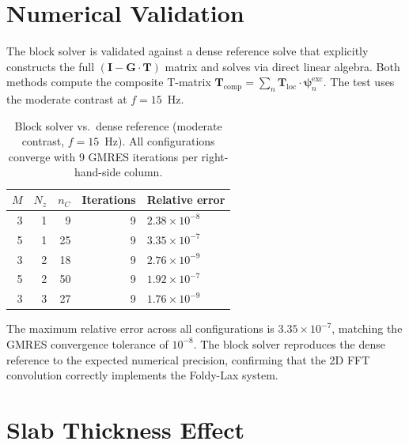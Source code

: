 \documentclass[11pt,a4paper]{article}
\theoremstyle{plain}
\theoremstyle{remark}
\begin{document}
\section{Numerical Validation}\label{sec:validation}

The block solver is validated against a dense reference solve that
explicitly constructs the full $(\mathbf{I} - \mathbf{G}\cdot
\mathbf{T})$ matrix and solves via direct linear algebra.  Both methods
compute the composite T-matrix $\mathbf{T}_{\mathrm{comp}} = \sum_n
\mathbf{T}_{\mathrm{loc}} \cdot \bm{\psi}_n^{\mathrm{exc}}$.  The test
uses the moderate contrast at $f = 15$~Hz.

\begin{table}[ht]
\centering
\renewcommand{\arraystretch}{1.2}
\caption{Block solver vs.\ dense reference (moderate contrast,
$f = 15$~Hz).  All configurations converge with 9 GMRES iterations
per right-hand-side column.}
\label{tab:validation}
\begin{tabular}{rrrrl}
  \toprule
  $M$ & $N_z$ & $n_C$ & Iterations & Relative error \\
  \midrule
  3 & 1 &  9 & 9 & $2.38 \times 10^{-8}$ \\
  5 & 1 & 25 & 9 & $3.35 \times 10^{-7}$ \\
  3 & 2 & 18 & 9 & $2.76 \times 10^{-9}$ \\
  5 & 2 & 50 & 9 & $1.92 \times 10^{-7}$ \\
  3 & 3 & 27 & 9 & $1.76 \times 10^{-9}$ \\
  \bottomrule
\end{tabular}
\end{table}

The maximum relative error across all configurations is
$3.35 \times 10^{-7}$, matching the GMRES convergence tolerance of
$10^{-8}$.  The block solver reproduces the dense reference to the
expected numerical precision, confirming that the 2D FFT convolution
correctly implements the Foldy-Lax system.

\section{Slab Thickness Effect}\label{sec:thickness}
\end{document}
